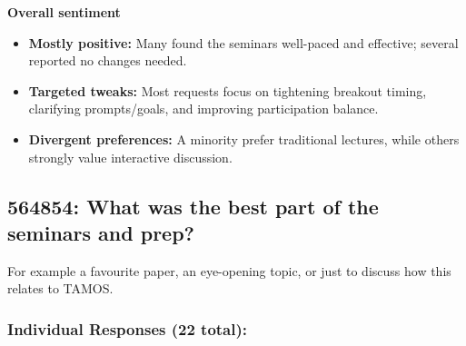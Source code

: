 \documentclass[a4paper]{report}
\begin{document}
\textbf{Overall sentiment}
\begin{itemize}
\item \textbf{Mostly positive:} Many found the seminars well-paced and effective; several reported no changes needed.
\item \textbf{Targeted tweaks:} Most requests focus on tightening breakout timing, clarifying prompts/goals, and improving participation balance.
\item \textbf{Divergent preferences:} A minority prefer traditional lectures, while others strongly value interactive discussion.
\end{itemize}

\subsection{564854: What was the best part of the seminars and prep?}

For example a favourite paper, an eye-opening topic, or just to discuss how 
this relates to TAMOS.

\subsubsection{Individual Responses (22 total):}
\end{document}
